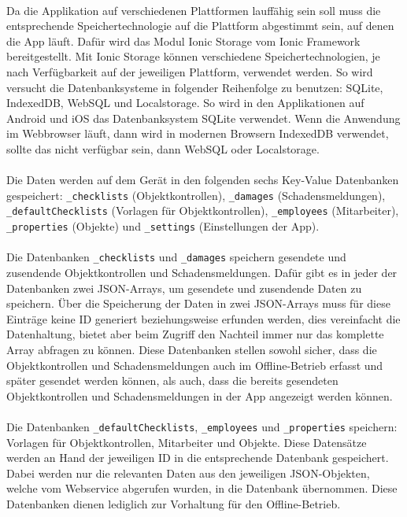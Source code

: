 \documentclass[12pt]{article}
\begin{document}
\paragraph{}Da die Applikation auf verschiedenen Plattformen lauffähig sein soll muss die entsprechende Speichertechnologie auf die Plattform abgestimmt sein, auf denen die App läuft. Dafür wird das Modul Ionic Storage vom Ionic Framework bereitgestellt. Mit Ionic Storage können verschiedene Speichertechnologien, je nach Verfügbarkeit auf der jeweiligen Plattform, verwendet werden. So wird versucht die Datenbanksysteme in folgender Reihenfolge zu benutzen: SQLite, IndexedDB, WebSQL und Localstorage. So wird in den Applikationen auf Android und iOS das Datenbanksystem SQLite verwendet. Wenn die Anwendung im Webbrowser läuft, dann wird in modernen Browsern IndexedDB verwendet, sollte das nicht verfügbar sein, dann WebSQL oder Localstorage. 

\paragraph{}Die Daten werden auf dem Gerät in den folgenden sechs Key-Value Datenbanken gespeichert: \texttt{\_checklists} (Objektkontrollen), \texttt{\_damages} (Schadensmeldungen), \texttt{\_defaultChecklists} (Vorlagen für Objektkontrollen), \texttt{\_employees} (Mitarbeiter), \texttt{\_properties} (Objekte) und \texttt{\_settings} (Einstellungen der App).

\paragraph{}Die Datenbanken \texttt{\_checklists} und \texttt{\_damages} speichern gesendete und zusendende Objektkontrollen und Schadensmeldungen. Dafür gibt es in jeder der Datenbanken zwei JSON-Arrays, um gesendete und zusendende Daten zu speichern. Über die Speicherung der Daten in zwei JSON-Arrays muss für diese Einträge keine ID generiert beziehungsweise erfunden werden, dies vereinfacht die Datenhaltung, bietet aber beim Zugriff den Nachteil immer nur das komplette Array abfragen zu können. Diese Datenbanken stellen sowohl sicher, dass die Objektkontrollen und Schadensmeldungen auch im Offline-Betrieb erfasst und später gesendet werden können, als auch, dass die bereits gesendeten Objektkontrollen und Schadensmeldungen in der App angezeigt werden können.

\paragraph{}Die Datenbanken \texttt{\_defaultChecklists}, \texttt{\_employees} und \texttt{\_properties} speichern: Vorlagen für Objektkontrollen, Mitarbeiter und Objekte. Diese Datensätze werden an Hand der jeweiligen ID in die entsprechende Datenbank gespeichert. Dabei werden nur die relevanten Daten aus den jeweiligen JSON-Objekten, welche vom Webservice abgerufen wurden, in die Datenbank übernommen. Diese Datenbanken dienen lediglich zur Vorhaltung für den Offline-Betrieb.
\end{document}
